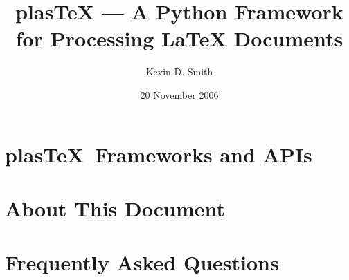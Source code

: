 \documentclass{manual}
\title{plasTeX --- A Python Framework for Processing LaTeX Documents}
\author{Kevin D. Smith}
\date{20 November 2006}
\newcommand{\plasTeX}{plas\TeX}
\begin{document}
\maketitle
\cleardoublepage
\tableofcontents












\chapter{\plasTeX\ Frameworks and APIs}









\appendix

\chapter{About This Document}



\chapter{Frequently Asked Questions}




\end{document}
